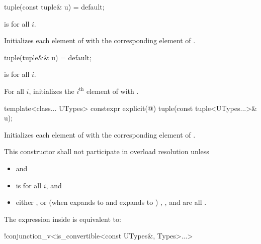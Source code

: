 %
\begin{itemdecl}
tuple(const tuple& u) = default;
\end{itemdecl}

\begin{itemdescr}
\pnum
\requires {} is  for all $i$.

\pnum
\effects Initializes each element of  with the
corresponding element of .
\end{itemdescr}

%
\begin{itemdecl}
tuple(tuple&& u) = default;
\end{itemdecl}

\begin{itemdescr}
\pnum
\requires {} is  for all $i$.

\pnum
\effects For all $i$, initializes the $i^\text{th}$ element of  with
.
\end{itemdescr}

%
\begin{itemdecl}
template<class... UTypes> constexpr explicit(@\seebelow@) tuple(const tuple<UTypes...>& u);
\end{itemdecl}

\begin{itemdescr}
\pnum
\effects Initializes each element of 
with the corresponding element of .

\pnum
\remarks This constructor shall not participate in overload resolution unless
\begin{itemize}
\item
{} \tcode{==}  and
\item
{} is  for all $i$, and
\item
either
, or
(when  expands to  and  expands to )
, , and  are all .
\end{itemize}
The expression inside  is equivalent to:
\begin{codeblock}
!conjunction_v<is_convertible<const UTypes&, Types>...>
\end{codeblock}
\end{itemdescr}


